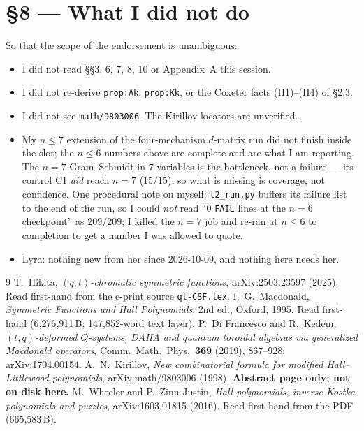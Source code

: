 \documentclass[11pt]{article}
\begin{document}
\section{\S8 --- What I did not do}

So that the scope of the endorsement is unambiguous:
\begin{itemize}[leftmargin=1.4em,itemsep=0.05em]
\item I did not read \S\S3, 6, 7, 8, 10 or Appendix~A this session.
\item I did not re-derive \texttt{prop:Ak}, \texttt{prop:Kk}, or the Coxeter facts (H1)--(H4) of \S2.3.
\item I did not see \texttt{math/9803006}. The Kirillov locators are unverified.
\item My $n\le7$ extension of the four-mechanism $d$-matrix run did not finish inside the slot; the
  $n\le6$ numbers above are complete and are what I am reporting. The $n=7$ Gram--Schmidt in $7$
  variables is the bottleneck, not a failure --- its control C1 \emph{did} reach $n=7$ ($15/15$),
  so what is missing is coverage, not confidence. One procedural note on myself: \texttt{t2\_run.py}
  buffers its failure list to the end of the run, so I could \emph{not} read ``$0$ \texttt{FAIL}
  lines at the $n=6$ checkpoint'' as $209/209$; I killed the $n=7$ job and re-ran at $n\le6$ to
  completion to get a number I was allowed to quote.
\item Lyra: nothing new from her since 2026-10-09, and nothing here needs her.
\end{itemize}

\begin{thebibliography}{9}
 T.~Hikita, \emph{$(q,t)$-chromatic symmetric functions}, arXiv:2503.23597 (2025).
  Read first-hand from the e-print source \texttt{qt-CSF.tex}.
 I.~G.~Macdonald, \emph{Symmetric Functions and Hall Polynomials}, 2nd ed.,
  Oxford, 1995. Read first-hand (6{,}276{,}911\,B; 147{,}852-word text layer).
 P.~Di Francesco and R.~Kedem, \emph{$(t,q)$-deformed $Q$-systems, DAHA and quantum
  toroidal algebras via generalized Macdonald operators}, Comm.\ Math.\ Phys.\ \textbf{369} (2019),
  867--928; arXiv:1704.00154.
 A.~N.~Kirillov, \emph{New combinatorial formula for modified Hall--Littlewood
  polynomials}, arXiv:math/9803006 (1998). \textbf{Abstract page only; not on disk here.}
 M.~Wheeler and P.~Zinn-Justin, \emph{Hall polynomials, inverse Kostka polynomials and
  puzzles}, arXiv:1603.01815 (2016). Read first-hand from the PDF (665{,}583\,B).
\end{thebibliography}
\end{document}
